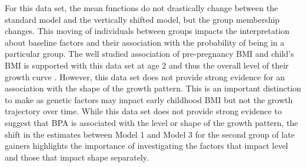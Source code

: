 For this data set, the mean functions do not drastically change between the standard model and the vertically shifted model, but the group membership changes. This moving of individuals between groups impacts the interpretation about baseline factors and their association with the probability of being in a particular group. The well studied association of pre-pregnancy BMI and child's BMI is supported with this data set at age 2 and thus the overall level of their growth curve \cite{whitaker1997}. However, this data set does not provide strong evidence for an association with  the shape of the growth pattern. This is an important distinction to make as genetic factors may impact early childhood BMI but not the growth trajectory over time. While this data set does not provide strong evidence to suggest that BPA is associated with the level or shape of the growth pattern, the shift in the estimates between Model 1 and Model 3 for the second group of late gainers highlights the importance of investigating the factors that impact level and those that impact shape separately.

